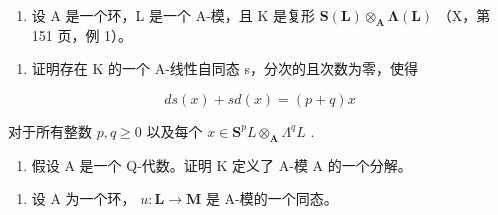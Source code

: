 
\begin{enumerate}
\def\labelenumi{\arabic{enumi})}
\tightlist
\item
  设 A 是一个环，L 是一个 A-模，且 K 是复形 \(\mathbf{S}(\mathbf{L})\otimes_{\mathbf{A}}\symbf{\Lambda}(\mathbf{L})\) （X，第 151 页，例 1）。
\end{enumerate}

\begin{enumerate}
\def\labelenumi{\alph{enumi})}
\tightlist
\item
  证明存在 K 的一个 A-线性自同态 s，分次的且次数为零，使得
\end{enumerate}

\[
d s (x) + s d (x) = (p + q) x
\]

对于所有整数 \(p, q \geqslant 0\) 以及每个 \(x \in \mathbf{S}^p L \otimes_{\mathbf{A}} \Lambda^q L\) .

\begin{enumerate}
\def\labelenumi{\alph{enumi})}
\setcounter{enumi}{1}
\tightlist
\item
  假设 A 是一个 Q-代数。证明 K 定义了 A-模 A 的一个分解。
\end{enumerate}

\begin{enumerate}
\def\labelenumi{\arabic{enumi})}
\setcounter{enumi}{1}
\tightlist
\item
  设 A 为一个环， \(u: \mathbf{L} \to \mathbf{M}\) 是 A-模的一个同态。
\end{enumerate}

